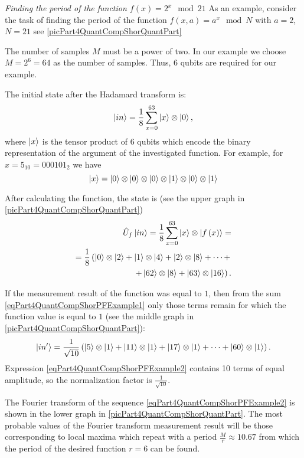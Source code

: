 \begin{example}
\emph{Finding the period of the function $f\left(x\right) = 2^x \mod 21$}
\label{exPart4QuantCompShorQuantPeriodFinding}
As an example, consider the task of finding the period of the function 
$f\left(x, a\right) = a^x \mod{N}$ with $a=2$, $N = 21$ see 
\autoref{picPart4QuantCompShorQuantPart}

The number of samples $M$ must be a power of two. In our example we
choose $M = 2^6 = 64$ as the number of samples. Thus,
6 qubits are required for our example.

The initial state after the Hadamard transform is:
\begin{equation}
\ket{in} = \frac{1}{8}\sum_{x = 0}^{63}\ket{x} \otimes \ket{0},
\nonumber
\end{equation}
where $\ket{x}$ is the tensor product 
of 6 qubits
which encode the binary representation of the argument of the investigated
function. For example, for $x=5_{10}=000101_2$ we have
\[
\ket{x} = \ket{0}\otimes \ket{0}\otimes
\ket{0}\otimes 
\ket{1}\otimes \ket{0}\otimes \ket{1}
\]

After calculating the function, the state is (see the upper graph
in \autoref{picPart4QuantCompShorQuantPart})
\begin{eqnarray}
\hat{U}_f\ket{in} = \frac{1}{8}\sum_{x = 0}^{63}\ket{x}
\otimes \left|f\left(x\right)\right> = 
\nonumber \\
=
\frac{1}{8}
\left(
\ket{0}\otimes\ket{2} + 
\ket{1}\otimes\ket{4} + 
\ket{2}\otimes\ket{8} + \dots +
\right.
\nonumber \\
\left.
+
\ket{62}\otimes\ket{8} +
\ket{63}\otimes\ket{16}
\right).
\label{eqPart4QuantCompShorPFExample1}
\end{eqnarray}

If the measurement result of the function was equal to $1$, then from the sum
\eqref{eqPart4QuantCompShorPFExample1} only those terms remain for which
the function value is equal to $1$ (see the middle graph
in \autoref{picPart4QuantCompShorQuantPart}):
\begin{equation}
\ket{in'} = \frac{1}{\sqrt{10}}\left( 
\ket{5}\otimes\ket{1} +
\ket{11}\otimes\ket{1} +
\ket{17}\otimes\ket{1} +
\dots +
\ket{60}\otimes\ket{1}
\right).
\label{eqPart4QuantCompShorPFExample2}
\end{equation} 
Expression \eqref{eqPart4QuantCompShorPFExample2} contains 10 terms
of equal amplitude, so the normalization factor is
$\frac{1}{\sqrt{10}}$.

The Fourier transform of the sequence
\eqref{eqPart4QuantCompShorPFExample2} is shown in the lower graph
in \autoref{picPart4QuantCompShorQuantPart}. The most probable
values of the Fourier transform measurement result will be those corresponding to local maxima which repeat with a period 
$\frac{M}{r}\approx10.67$ from which the period of the desired function
$r=6$ can be found. 

\end{example}